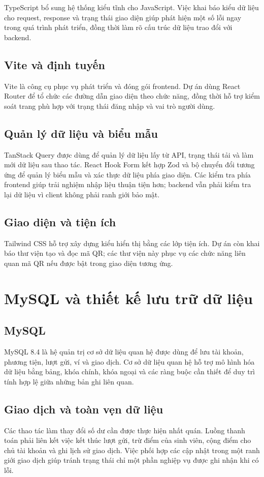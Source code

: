 TypeScript bổ sung hệ thống kiểu tĩnh cho JavaScript. Việc khai báo kiểu dữ liệu cho request, response và trạng thái giao diện giúp phát hiện một số lỗi ngay trong quá trình phát triển, đồng thời làm rõ cấu trúc dữ liệu trao đổi với backend.

\subsection{Vite và định tuyến}
Vite là công cụ phục vụ phát triển và đóng gói frontend. Dự án dùng React Router để tổ chức các đường dẫn giao diện theo chức năng, đồng thời hỗ trợ kiểm soát trang phù hợp với trạng thái đăng nhập và vai trò người dùng.

\subsection{Quản lý dữ liệu và biểu mẫu}
TanStack Query được dùng để quản lý dữ liệu lấy từ API, trạng thái tải và làm mới dữ liệu sau thao tác. React Hook Form kết hợp Zod và bộ chuyển đổi tương ứng để quản lý biểu mẫu và xác thực dữ liệu phía giao diện. Các kiểm tra phía frontend giúp trải nghiệm nhập liệu thuận tiện hơn; backend vẫn phải kiểm tra lại dữ liệu vì client không phải ranh giới bảo mật.

\subsection{Giao diện và tiện ích}
Tailwind CSS hỗ trợ xây dựng kiểu hiển thị bằng các lớp tiện ích. Dự án còn khai báo thư viện tạo và đọc mã QR; các thư viện này phục vụ các chức năng liên quan mã QR nếu được bật trong giao diện tương ứng.

\section{MySQL và thiết kế lưu trữ dữ liệu}

\subsection{MySQL}
MySQL 8.4 là hệ quản trị cơ sở dữ liệu quan hệ được dùng để lưu tài khoản, phương tiện, lượt gửi, ví và giao dịch. Cơ sở dữ liệu quan hệ hỗ trợ mô hình hóa dữ liệu bằng bảng, khóa chính, khóa ngoại và các ràng buộc cần thiết để duy trì tính hợp lệ giữa những bản ghi liên quan.

\subsection{Giao dịch và toàn vẹn dữ liệu}
Các thao tác làm thay đổi số dư cần được thực hiện nhất quán. Luồng thanh toán phải liên kết việc kết thúc lượt gửi, trừ điểm của sinh viên, cộng điểm cho chủ tài khoản và ghi lịch sử giao dịch. Việc phối hợp các cập nhật trong một ranh giới giao dịch giúp tránh trạng thái chỉ một phần nghiệp vụ được ghi nhận khi có lỗi.


